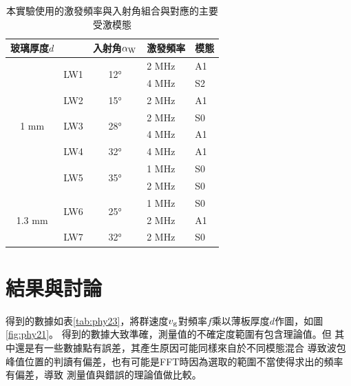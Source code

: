 \documentclass[12pt]{report}
\begin{document}
\begin{table}[htbp]
\centering
\caption{本實驗使用的激發頻率與入射角組合與對應的主要受激模態}
\label{tab:lwset}
\begin{tabular}{@{}cccll@{}}
\toprule
\multicolumn{1}{l}{玻璃厚度$d$} & \multicolumn{1}{l}{}    & 入射角$\alpha_{\rm W}$                  & 激發頻率 & 模態 \\ \midrule
\multirow{8}{*}{1 mm}    & \multirow{2}{*}{LW1}    & \multirow{2}{*}{12°} & 2 MHz         & A1     \\
                         &                         &                      & 4 MHz         & S2     \\ \cmidrule(l){2-5} 
                         & \multicolumn{1}{l}{LW2} & 15°                  & 2 MHz         & A1     \\ \cmidrule(l){2-5} 
                         & \multirow{2}{*}{LW3}    & \multirow{2}{*}{28°} & 2 MHz         & S0     \\
                         &                         &                      & 4 MHz         & A1     \\ \cmidrule(l){2-5} 
                         & \multicolumn{1}{l}{LW4} & 32°                  & 4 MHz         & A1     \\ \cmidrule(l){2-5} 
                         & \multirow{2}{*}{LW5}    & \multirow{2}{*}{35°} & 1 MHz         & S0     \\
                         &                         &                      & 2 MHz         & S0     \\ \midrule
\multirow{3}{*}{1.3 mm}  & \multirow{2}{*}{LW6}    & \multirow{2}{*}{25°} & 1 MHz         & S0     \\
                         &                         &                      & 2 MHz         & A1     \\ \cmidrule(l){2-5} 
                         & \multicolumn{1}{l}{LW7} & 32°                  & 2 MHz         & S0     \\ \bottomrule
\end{tabular}
\end{table}

\section{結果與討論}

得到的數據如表\ref{tab:phy23}，將群速度$v_{\rm g}$對頻率$f$乘以薄板厚度$d$作圖，如圖\ref{fig:phy21}。
得到的數據大致準確，測量值的不確定度範圍有包含理論值。但
其中還是有一些數據點有誤差，其產生原因可能同樣來自於不同模態混合
導致波包峰值位置的判讀有偏差，也有可能是FFT時因為選取的範圍不當使得求出的頻率有偏差，導致
測量值與錯誤的理論值做比較。
\end{document}
